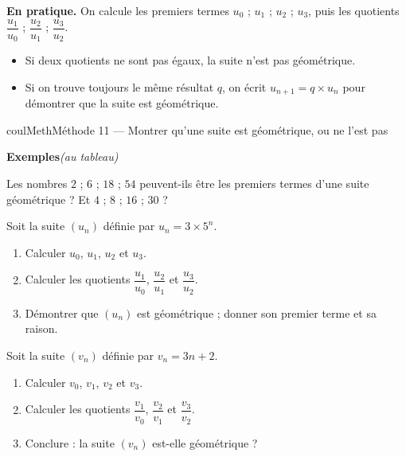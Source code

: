 \documentclass[11pt,a4paper]{article}
\makeatletter
\newcounter{lycee@signet}
\newcommand{\signet}[3][]{\stepcounter{lycee@signet}%
  \edef\lycee@dest{\if\relax\detokenize{#1}\relax
    signet.\arabic{lycee@signet}\else#1\fi}%
  \hypertarget{\lycee@dest}{}\bookmark[level=#2,dest=\lycee@dest]{#3}}
\newcounter{methode}
\newenvironment{methodebox}[1][Méthode]{\stepcounter{methode}%
  \begin{boitecours}[phantom={\signet[methode-\arabic{methode}]{2}{#1}}]{coulMeth}{#1}}%
  {\end{boitecours}}
\newcommand{\autableau}{\hfill{\footnotesize\itshape\color{black!45}(au tableau)}}
\newcommand{\etapeexemples}{%
    \par\smallskip\textbf{\color{coulMeth}Exemples}\autableau\par\nobreak\smallskip}
\makeatother
\begin{document}
\textbf{En pratique.} On calcule les premiers termes $u_{0}$ ; $u_{1}$ ; $u_{2}$ ; $u_{3}$,
puis les quotients $\dfrac{u_{1}}{u_{0}}$ ; $\dfrac{u_{2}}{u_{1}}$ ; $\dfrac{u_{3}}{u_{2}}$.
\begin{itemize}
  \item Si deux quotients ne sont pas égaux, la suite n'est pas géométrique.
  \item Si on trouve toujours le même résultat $q$, on écrit $u_{n+1}=q\times u_{n}$ pour
        démontrer que la suite est géométrique.
\end{itemize}

\begin{methodebox}[Méthode 11 --- Montrer qu'une suite est géométrique, ou ne l'est pas]
\etapeexemples
\begin{questions}[label=\alph*)]
  \item Les nombres $2$ ; $6$ ; $18$ ; $54$ peuvent-ils être les premiers termes d'une
        suite géométrique ? Et $4$ ; $8$ ; $16$ ; $30$ ?
  \item Soit la suite $(u_{n})$ définie par $u_{n}=3\times 5^{n}$.
        \begin{enumerate}[label=\arabic*)]
          \item Calculer $u_{0}$, $u_{1}$, $u_{2}$ et $u_{3}$.
          \item Calculer les quotients $\dfrac{u_{1}}{u_{0}}$, $\dfrac{u_{2}}{u_{1}}$ et
                $\dfrac{u_{3}}{u_{2}}$.
          \item Démontrer que $(u_{n})$ est géométrique ; donner son premier terme et sa
                raison.
        \end{enumerate}
  \item Soit la suite $(v_{n})$ définie par $v_{n}=3n+2$.
        \begin{enumerate}[label=\arabic*)]
          \item Calculer $v_{0}$, $v_{1}$, $v_{2}$ et $v_{3}$.
          \item Calculer les quotients $\dfrac{v_{1}}{v_{0}}$, $\dfrac{v_{2}}{v_{1}}$ et
                $\dfrac{v_{3}}{v_{2}}$.
          \item Conclure : la suite $(v_{n})$ est-elle géométrique ?
        \end{enumerate}
\end{questions}


\end{methodebox}
\end{document}
